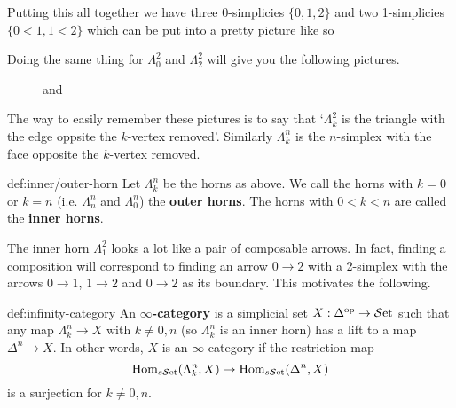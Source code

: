 Putting this all together we have three 0-simplicies $\{0,1,2\}$ and two 1-simplicies $\{0<1, 1<2\}$ which can be put into a pretty picture like so
	\begin{figure}[ht!]
	\centering
	\end{figure}

Doing the same thing for $\Lambda^2_0$ and $\Lambda^2_2$ will give you the following pictures.
	\begin{figure}[ht!]
	\centering
	and 
	\end{figure}

The way to easily remember these pictures is to say that `$\Lambda^2_k$ is the triangle with the edge oppsite the $k$-vertex removed'. Similarly $\Lambda^n_k$ is the $n$-simplex with the face opposite the $k$-vertex removed. 

\begin{definition}{def:inner/outer-horn}
	Let $\Lambda^n_k$ be the horns as above. We call the horns with $k=0$ or $k=n$ (i.e. $\Lambda^n_n$ and $\Lambda^n_0$) the \textbf{outer horns}. The horns with $0<k<n$ are called the \textbf{inner horns}.
\end{definition}

The inner horn $\Lambda^2_1$ looks a lot like a pair of composable arrows. In fact, finding a composition will correspond to finding an arrow $0 \to 2$ with a 2-simplex with the arrows $0 \to 1$, $1 \to 2$ and $0 \to 2$ as its boundary. This motivates the following.

\begin{definition}{def:infinity-category}
	An \textbf{$\infty$-category} is a simplicial set $X : \Delta^\text{op} \to {\mathcal{S}\text{et}}$ such that any map $\Lambda^n_k \to X$ with $k \neq 0,n$ (so $\Lambda^n_k$ is an inner horn) has a lift to a map $\Delta^n \to X$. In other words, $X$ is an $\infty$-category if the restriction map
	\[
	{\text{Hom}}_{s{\mathcal{S}\text{et}}}(\Lambda^n_k,X)
	\to
	{\text{Hom}}_{s{\mathcal{S}\text{et}}}(\Delta^n,X) 
	\]
is a surjection for $k\neq0,n$.
\end{definition}

